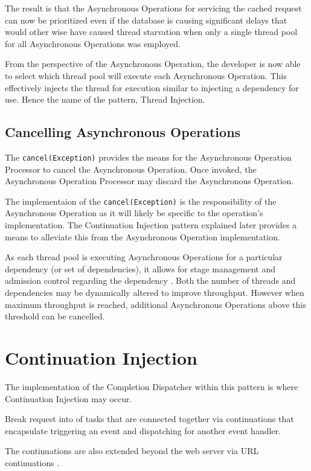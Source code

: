 \documentclass{article}
\begin{document}
The result is that the Asynchronous Operations for servicing the cached request
can now be prioritized even if the database is causing significant delays that
would other wise have caused thread starvation when only a single thread pool
for all Asynchronous Operations was employed.

From the perspective of the Asynchronous Operation, the developer is now able to
select which thread pool will execute each Asynchronous Operation.  This
effectively injects the thread for execution similar to injecting a dependency
for use.  Hence the name of the pattern, Thread Injection.


\subsection{Cancelling Asynchronous Operations}

The \texttt{cancel(Exception)} provides the means for the Asynchronous Operation
Processor to cancel the Asynchronous Operation.  Once invoked, the Asynchronous
Operation Processor may discard the Asynchronous Operation.

The implementaion of the \texttt{cancel(Exception)} is the responsibility of the
Asynchronous Operation as it will likely be specific to the operation's
implementation.  The Continuation Injection pattern explained later provides a
means to alleviate this from the Asynchronous Operation implementation.

As each thread pool is executing Asynchronous Operations for a particular
dependency (or set of dependencies), it allows for stage management and
admission control regarding the dependency \cite{seda}.  Both the number of
threads and dependencies may be dynamically altered to improve throughput. 
However when maximum throughput is reached, additional Asynchronous Operations
above this threshold can be cancelled.


\section{Continuation Injection}

The implementation of the Completion Dispatcher within this pattern is where
Continuation Injection may occur.

Break request into \cite{pipeline} of tasks that are connected together via
continuations \cite{continuations} that encapsulate triggering an event and
dispatching for another event handler.

The continuations are also extended beyond the web server via URL continuations
\cite{url-continuation}.
\end{document}
